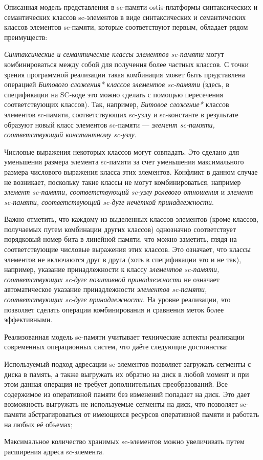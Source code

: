 Описанная модель представления в sc-памяти ostis-платформы синтаксических и семантических классов sc-элементов в виде синтаксических и семантических классов элементов sc-памяти, которые соответствуют первым, обладает рядом преимуществ:
\begin{textitemize}
	\item \textit{Синтаксические и семантические классы элементов sc-памяти} могут комбинироваться между собой для получения более частных классов. С точки зрения программной реализации такая комбинация может быть представлена операцией \textit{Битового сложения*} \textit{классов элементов sc-памяти} (здесь, в спецификации на SC-коде это можно сделать с помощью пересечения соответствующих классов). Так, например, \textit{Битовое сложение*} классов элементов sc-памяти, соответствующих sc-узлу и sc-константе в результате образуют новый класс элементов sc-памяти --- \textit{элемент sc-памяти, соответствующий константному sc-узлу}.
	\item Числовые выражения некоторых классов могут совпадать. Это сделано для уменьшения размера элемента sc-памяти за счет уменьшения максимального размера числового выражения класса этих элементов. Конфликт в данном случае не возникает, поскольку такие классы не могут комбинироваться, например \textit{элемент sc-памяти, соответствующий sc-узлу ролевого отношения} и \textit{элемент sc-памяти, соответствующий sc-дуге нечёткой принадлежности}.
	\item Важно отметить, что каждому из выделенных классов элементов (кроме классов, получаемых путем комбинации других классов) однозначно соответствует порядковый номер бита в линейной памяти, что можно заметить, глядя на соответствующие числовые выражения этих классов. Это означает, что классы элементов не включаются друг в друга (хоть в спецификации это и не так), например, указание принадлежности к классу \textit{элементов sc-памяти, соответствующих sc-дуге позитивной принадлежности} не означает автоматическое указание принадлежности \textit{элементов sc-памяти, соответствующих sc-дуге принадлежности}. На уровне реализации, это позволяет сделать операции комбинирования и сравнения меток более эффективными.
\end{textitemize}

Реализованная модель sc-памяти учитывает технические аспекты реализации современных операционных систем, что даёте следующие достоинства:
\begin{textitemize}
	\item Используемый подход адресации sc-элементов позволяет загружать сегменты с диска в память, а также выгружать их обратно на диск в любой момент и при этом данная операция не требует дополнительных преобразований. Все содержимое из оперативной памяти без изменений попадает на диск. Это дает возможность выгружать не используемые сегменты на диск, что позволяет sc-памяти абстрагироваться от имеющихся ресурсов оперативной памяти и работать на любых её объемах;
	\item Максимальное количество хранимых sc-элементов можно увеличивать путем расширения адреса sc-элемента.
\end{textitemize}

